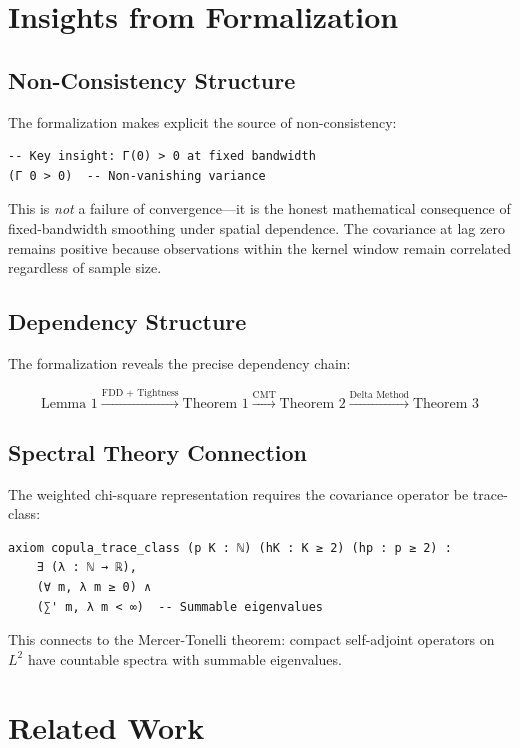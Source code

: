 \documentclass[11pt,a4paper]{article}
\theoremstyle{definition}
\begin{document}
\section{Insights from Formalization}
\label{sec:insights}

\subsection{Non-Consistency Structure}

The formalization makes explicit the source of non-consistency:

\begin{lstlisting}
-- Key insight: Γ(0) > 0 at fixed bandwidth
(Γ 0 > 0)  -- Non-vanishing variance
\end{lstlisting}

This is \emph{not} a failure of convergence---it is the honest mathematical consequence of fixed-bandwidth smoothing under spatial dependence. The covariance at lag zero remains positive because observations within the kernel window remain correlated regardless of sample size.

\subsection{Dependency Structure}

The formalization reveals the precise dependency chain:

\[
\text{Lemma 1} \xrightarrow{\text{FDD + Tightness}} \text{Theorem 1} \xrightarrow{\text{CMT}} \text{Theorem 2} \xrightarrow{\text{Delta Method}} \text{Theorem 3}
\]

\subsection{Spectral Theory Connection}

The weighted chi-square representation requires the covariance operator be trace-class:

\begin{lstlisting}
axiom copula_trace_class (p K : ℕ) (hK : K ≥ 2) (hp : p ≥ 2) :
    ∃ (λ : ℕ → ℝ), 
    (∀ m, λ m ≥ 0) ∧ 
    (∑' m, λ m < ∞)  -- Summable eigenvalues
\end{lstlisting}

This connects to the Mercer-Tonelli theorem: compact self-adjoint operators on $L^2$ have countable spectra with summable eigenvalues.

\section{Related Work}
\label{sec:related}
\end{document}
